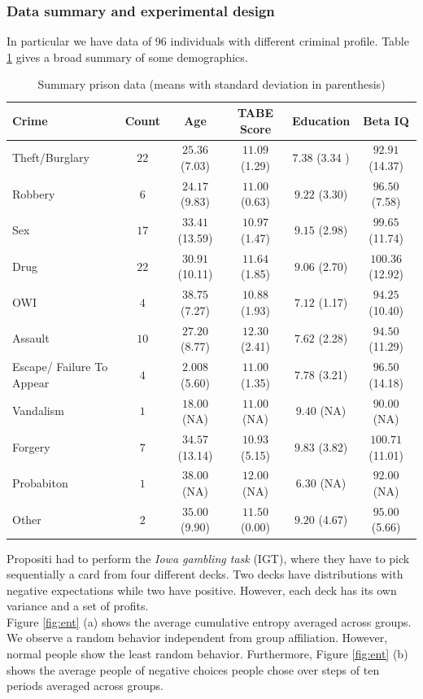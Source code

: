 \documentclass[12pt,a4paper,bibliography=totocnumbered,listof=totocnumbered]{scrartcl}
\begin{document}
\subsubsection{Data summary and experimental design}

In particular we have data of 96 individuals with different criminal profile. Table \ref{tab:tabps} gives a broad summary of some demographics. 

\begin{table}[!htbp]
	\footnotesize
	 \centering 
	\begin{tabular}{ l|ccccc} 
		\toprule 
		Crime & \textbf{Count} & \textbf{Age} & \textbf{TABE Score} & \textbf{Education} & \textbf{Beta IQ} \\ 
		\hline
	Theft/Burglary & $22$ & $25.36$  (7.03) & $11.09$ (1.29) & $7.38$ (3.34 )& $92.91$ (14.37) \\ 
	Robbery & $6$ & $24.17$ (9.83) & $11.00$ (0.63) & $9.22$ (3.30) & $96.50$ (7.58) \\          
	Sex & $17$ & $33.41$ (13.59) & $10.97$ (1.47) & $9.15$ (2.98) & $99.65$ (11.74) \\       
	Drug & $22$ & $30.91$ (10.11)  & $11.64$ (1.85)& $9.06$   (2.70)  & $100.36$ (12.92) \\     
	OWI & $4$ & $38.75$ (7.27) & $10.88$ (1.93) & $7.12$ (1.17)& $94.25$ (10.40) \\        
	Assault & $10$ & $27.20$ (8.77) & $12.30$ (2.41)& $7.62$ (2.28) & $94.50$ (11.29) \\       
	Escape/ Failure To Appear & $4$ & $2.008$ (5.60)& $11.00$ (1.35)& $7.78$  (3.21)& $96.50$  (14.18)\\     
	Vandalism & $1$ & $18.00$ (NA)& $11.00$ (NA)& $9.40$ (NA)& $90.00$ (NA)\\ 
	Forgery & $7$ & $34.57$ (13.14)& $10.93$ (5.15) & $9.83$ (3.82)& $100.71$ (11.01)\\       
	Probabiton & $1$ & $38.00$ (NA)& $12.00$ (NA)& $6.30$ (NA)& $92.00$ (NA)\\ 
	Other & $2$ & $35.00$ (9.90)& $11.50$ (0.00)& $9.20$ (4.67)& $95.00$ (5.66)\\       
		\bottomrule 
	\end{tabular} 
		\caption{Summary prison data (means with standard deviation in parenthesis)} 
		\label{tab:tabps} 
\end{table} 

Propositi had to perform the \textit{Iowa gambling task} (IGT), where they have to pick sequentially a card from four different decks. Two decks have distributions with negative expectations while two have positive. However, each deck has its own variance and a set of profits. \\
Figure \ref{fig:ent} (a) shows the average cumulative entropy averaged across groups. We observe a random behavior independent from group affiliation. However, normal people show the least random behavior. Furthermore, Figure \ref{fig:ent} (b) shows the average people of negative choices people chose over steps of ten periods averaged across groups.     
\end{document}

